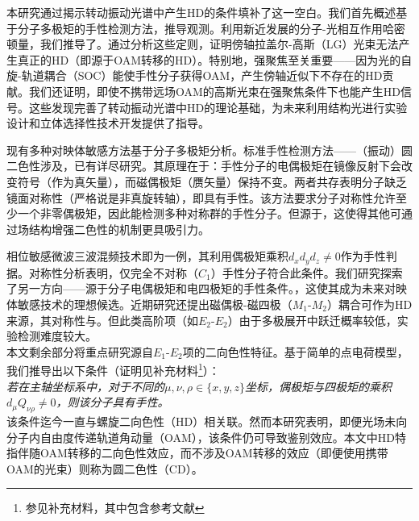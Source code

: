 \documentclass[reprint,aps,prl,twocolumn,superscriptaddress,groupedaddress]{revtex4-2}
\newcommand{\eomo}{$E_1$-$M_1$}
\newcommand{\eoet}{$E_1$-$E_2$}
\newcommand{\etet}{$E_2$-$E_2$}
\begin{document}
本研究通过揭示转动振动光谱中产生HD的条件填补了这一空白。我们首先概述基于分子多极矩的手性检测方法，推导观测。利用新近发展的分子-光相互作用哈密顿量\cite{Maslov2024,Maslov_Thesis}，我们推导了。通过分析这些定则，证明傍轴拉盖尔-高斯（LG）光束无法产生真正的HD（即源于OAM转移的HD）。特别地，强聚焦至关重要——因为光的自旋-轨道耦合（SOC）\cite{Bliokh2015}能使手性分子获得OAM，产生傍轴近似下不存在的HD贡献。我们还证明，即使不携带远场OAM的高斯光束在强聚焦条件下也能产生HD信号。这些发现完善了转动振动光谱中HD的理论基础，为未来利用结构光进行实验设计和立体选择性技术开发提供了指导。

现有多种对映体敏感方法基于分子多极矩分析。标准手性检测方法——（振动）圆二色性涉及，已有详尽研究\cite{Stephens1985,BUCKINGHAM1987,Mun2019,Lovesey2019}。其原理在于：手性分子的电偶极矩在镜像反射下会改变符号（作为真矢量），而磁偶极矩（赝矢量）保持不变。两者共存表明分子缺乏镜面对称性（严格说是非真旋转轴），即具有手性。该方法要求分子对称性允许至少一个非零偶极矩，因此能检测多种对称群的手性分子。但源于，这使得其他可通过场结构增强二色性的机制更具吸引力。

相位敏感微波三波混频技术\cite{Patterson2013,Patterson2013PRL}即为一例，其利用偶极矩乘积$d_xd_yd_z\neq 0$作为手性判据\cite{Patterson2013,Ordonez2018,Ayuso2022}。对称性分析表明，仅完全不对称（$C_1$）手性分子符合此条件。我们研究探索了另一方向——源于分子电偶极矩和电四极矩的手性条件。，这使其成为未来对映体敏感技术的理想候选。近期研究还提出磁偶极-磁四极（$M_1$-$M_2$）耦合可作为HD来源，其对称性与\cite{Ji2024}。但此类高阶项（如\etet）由于多极展开中跃迁概率较低，实验检测难度较大。\\
本文剩余部分将重点研究源自\eoet 项的二向色性特征。基于简单的点电荷模型，我们推导出以下条件（证明见补充材料\footnote{参见补充材料，其中包含参考文献\cite{Maslov2024,Maslov_Thesis,Lax1975,Bliokh2015,Bliokh2023}}）：\\
\textit{若在主轴坐标系中，对于不同的$\mu, \nu, \rho \in \{x,y,z\}$坐标，偶极矩与四极矩的乘积$d_{\mu}Q_{\nu \rho} \neq 0$，则该分子具有手性。}\\
该条件迄今一直与螺旋二向色性（HD）相关联\cite{ANDREWS2004,Forbes2018}。然而本研究表明，即便光场未向分子内自由度传递轨道角动量（OAM），该条件仍可导致鉴别效应。本文中HD特指伴随OAM转移的二向色性效应，而不涉及OAM转移的效应（即便使用携带OAM的光束）则称为圆二色性（CD）。
\end{document}
